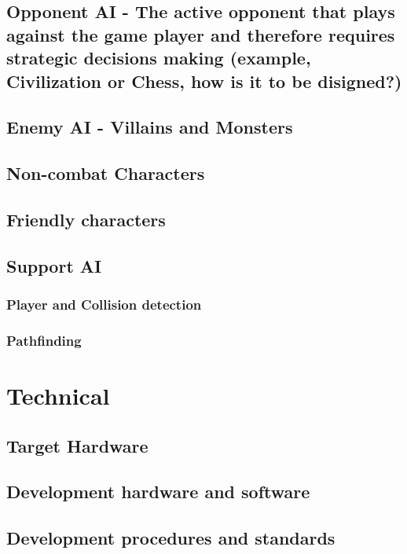 \documentclass[article, 11pt]{article}
\begin{document}
\subsection{Opponent AI - The active opponent that plays against the game player and therefore requires strategic decisions making (example, Civilization or Chess, how is it to be disigned?)}
\label{sec:org6119ea5}
\subsection{Enemy AI - Villains and Monsters}
\label{sec:org68ecf18}
\subsection{Non-combat Characters}
\label{sec:org07bfdb8}
\subsection{Friendly characters}
\label{sec:org1198f8f}
\subsection{Support AI}
\label{sec:orga58f6f6}
\subsubsection{Player and Collision detection}
\label{sec:orgc7eb419}
\subsubsection{Pathfinding}
\label{sec:org39213e9}

\section{Technical}
\label{sec:org42b8122}
\subsection{Target Hardware}
\label{sec:org831965e}
\subsection{Development hardware and software}
\label{sec:org8e3cdd3}
\subsection{Development procedures and standards}
\label{sec:org582b00a}
\end{document}
